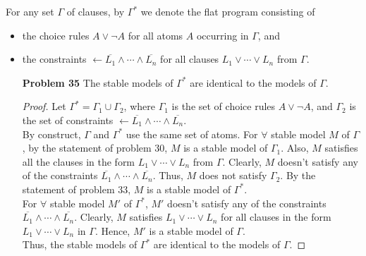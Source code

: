 For any set $\Gamma$ of clauses, by $\Gamma^*$ we denote the flat program consisting of 
\begin{itemize}
\item the choice rules $A \vee \neg A$ for all atoms $A$ occurring in $\Gamma$, and 
\item the constraints $\leftarrow \overline{L_1} \wedge \cdots \wedge \overline{L_n}$ for all clauses $L_1 \vee \cdots \vee L_n$ from $\Gamma$. 
\end{itemize}

\begin{enumerate}
\item[\textbf{Problem 35}] The stable models of $\Gamma^*$ are identical to the models of $\Gamma$. 
\begin{proof}
Let $\Gamma^* = \Gamma_1 \cup \Gamma_2$, where $\Gamma_1$ is the set of choice rules $A \vee \neg A$, and $\Gamma_2$ is the set of constraints $\leftarrow \overline{L_1} \wedge \cdots \wedge \overline{L_n}$. \\
By construct, $\Gamma$ and $\Gamma^*$ use the same set of atoms. For $\forall$ stable model $M$ of $\Gamma$, by the statement of problem 30, $M$ is a stable model of $\Gamma_1$. Also, $M$ satisfies all the clauses in the form $L_1 \vee \cdots \vee L_n$ from $\Gamma$. Clearly, $M$ doesn't satisfy any of the constraints $\overline{L_1} \wedge \cdots \wedge \overline{L_n}$. Thus, $M$ does not satisfy $\Gamma_2$. By the statement of problem 33, $M$ is a stable model of $\Gamma^*$. \\
For $\forall$ stable model $M'$ of $\Gamma^*$, $M'$ doesn't satisfy any of the constraints $\overline{L_1} \wedge \cdots \wedge \overline{L_n}$. Clearly, $M$ satisfies $L_1 \vee \cdots \vee L_n$ for all clauses in the form $L_1 \vee \cdots \vee L_n$ in $\Gamma$. Hence, $M'$ is a stable model of $\Gamma$. \\
Thus, the stable models of $\Gamma^*$ are identical to the models of $\Gamma$. 

\end{proof}
\end{enumerate}